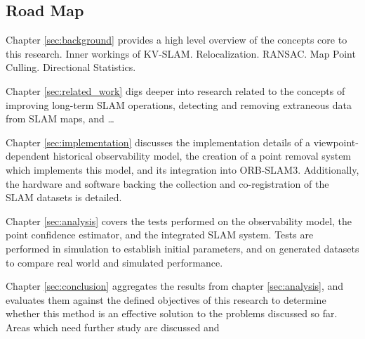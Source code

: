 \subsection{Road Map}

Chapter \ref{sec:background} provides a high level overview of the concepts core to this research. Inner workings of KV-SLAM. Relocalization. RANSAC. Map Point Culling. Directional Statistics.

Chapter \ref{sec:related_work} digs deeper into research related to the concepts of improving long-term SLAM operations, detecting and removing extraneous data from SLAM maps, and \dots

Chapter \ref{sec:implementation} discusses the implementation details of a viewpoint-dependent historical observability model, the creation of a point removal system which implements this model, and its integration into ORB-SLAM3. Additionally, the hardware and software backing the collection and co-registration of the SLAM datasets is detailed.

Chapter \ref{sec:analysis} covers the tests performed on the observability model, the point confidence estimator, and the integrated SLAM system. Tests are performed in simulation to establish initial parameters, and on generated datasets to compare real world and simulated performance.

Chapter \ref{sec:conclusion} aggregates the results from chapter \ref{sec:analysis}, and evaluates them against the defined objectives of this research to determine whether this method is an effective solution to the problems discussed so far. Areas which need further study are discussed and 